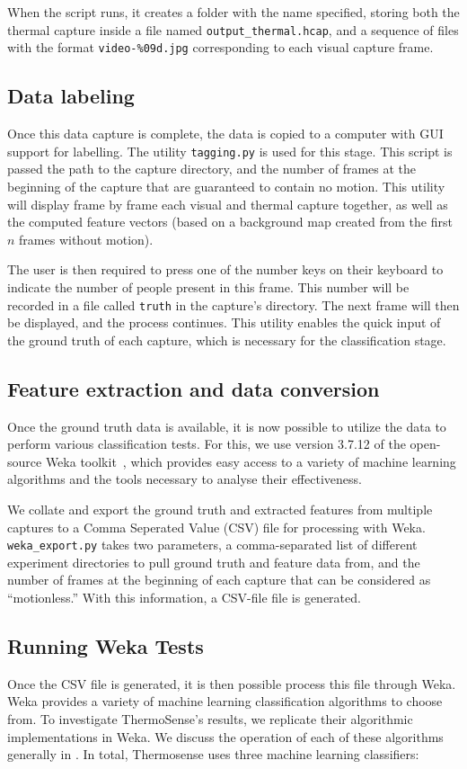 \documentclass[../thesis/thesis.tex]{subfiles}
\begin{document}
When the script runs, it creates a folder with the name specified, storing both the thermal capture inside a file named \texttt{output\_thermal.hcap}, and a sequence of files with the format \texttt{video-\%09d.jpg} corresponding to each visual capture frame.

\subsection{Data labeling}
\label{subsec:datalabelling}
Once this data capture is complete, the data is copied to a computer with GUI support for labelling. The utility \texttt{tagging.py} is used for this stage. This script is passed the path to the capture directory, and the number of frames at the beginning of the capture that are guaranteed to contain no motion. This utility will display frame by frame each visual and thermal capture together, as well as the computed feature vectors (based on a background map created from the first $n$ frames without motion).

The user is then required to press one of the number keys on their keyboard to indicate the number of people present in this frame. This number will be recorded in a file called \texttt{truth} in the capture's directory. The next frame will then be displayed, and the process continues. This utility enables the quick input of the ground truth of each capture, which is necessary for the classification stage.

\subsection{Feature extraction and data conversion}
Once the ground truth data is available, it is now possible to utilize the data to perform various classification tests. For this, we use version 3.7.12 of the open-source Weka toolkit~\cite{Weka}, which provides easy access to a variety of machine learning algorithms and the tools necessary to analyse their effectiveness.

We collate and export the ground truth and extracted features from multiple captures to a Comma Seperated Value (CSV) file for processing with Weka. \texttt{weka\_export.py} takes two parameters, a comma-separated list of different experiment directories to pull ground truth and feature data from, and the number of frames at the beginning of each capture that can be considered as ``motionless.'' With this information, a CSV-file file is generated.

\subsection{Running Weka Tests}
Once the CSV file is generated, it is then possible process this file through Weka. Weka provides a variety of machine learning classification algorithms to choose from. To investigate ThermoSense's results, we replicate their algorithmic implementations in Weka. We discuss the operation of each of these algorithms generally in . In total, Thermosense uses three machine learning classifiers:
\end{document}
